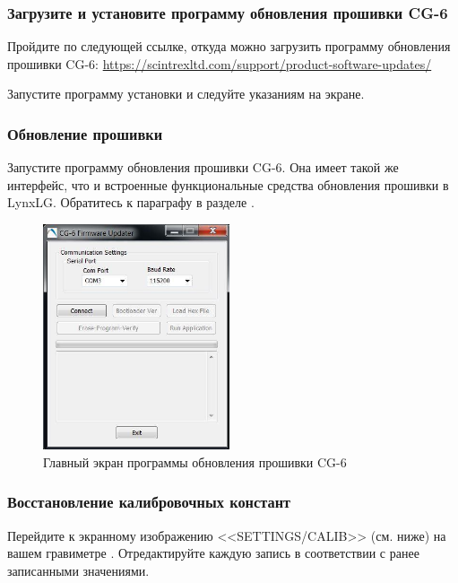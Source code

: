 \subsubsection{Загрузите и установите программу обновления
  прошивки CG-6}

Пройдите по следующей ссылке, откуда можно загрузить программу обновления
прошивки CG-6:
\url{https://scintrexltd.com/support/product-software-updates/}

Запустите программу установки и следуйте указаниям на экране.

\subsubsection{Обновление прошивки}

Запустите программу обновления прошивки CG-6. Она имеет такой же интерфейс, что
и встроенные функциональные средства обновления прошивки в LynxLG. Обратитесь к
параграфу  в разделе
.

\begin{figure}[H]
  \centering
  \includegraphics[width=0.49\textwidth]{figures/cg6_firmware_update_main_screen}
  \caption{Главный экран программы обновления прошивки CG-6}
  \label{fig:cg6_firmware_update_main_screen}
\end{figure}

\subsubsection{Восстановление калибровочных констант}

Перейдите к экранному изображению <<SETTINGS/CALIB>> (см. ниже) на вашем
гравиметре \cg{}. Отредактируйте каждую запись в соответствии с ранее записанными
значениями.

